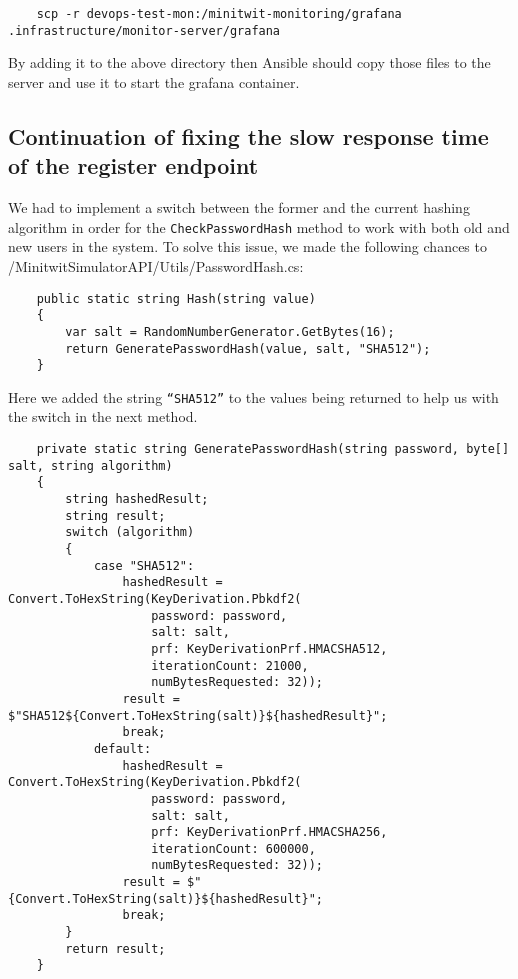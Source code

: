 \begin{verbatim}
    scp -r devops-test-mon:/minitwit-monitoring/grafana .infrastructure/monitor-server/grafana
\end{verbatim}

By adding it to the above directory then Ansible should copy those files to the server and use it to start the grafana container.

\subsection{Continuation of fixing the slow response time of the register endpoint}
\label{log:continuation-of-fixing-the-slow-response-time-of-the-register-endpoint}

We had to implement a switch between the former and the current hashing algorithm in order for the \texttt{CheckPasswordHash} method to work with both old and new users in the system. To solve this issue, we made the following chances to /MinitwitSimulatorAPI/Utils/PasswordHash.cs:

\begin{verbatim}
    public static string Hash(string value)
    {
        var salt = RandomNumberGenerator.GetBytes(16);
        return GeneratePasswordHash(value, salt, "SHA512");
    }
\end{verbatim}

Here we added the string \texttt{“SHA512”} to the values being returned to help us with the switch in the next method.

\begin{verbatim}
    private static string GeneratePasswordHash(string password, byte[] salt, string algorithm)
    {
        string hashedResult;
        string result;
        switch (algorithm)
        {
            case "SHA512":
                hashedResult = Convert.ToHexString(KeyDerivation.Pbkdf2(
                    password: password,
                    salt: salt,
                    prf: KeyDerivationPrf.HMACSHA512,
                    iterationCount: 21000,
                    numBytesRequested: 32));
                result = $"SHA512${Convert.ToHexString(salt)}${hashedResult}";
                break;
            default:
                hashedResult = Convert.ToHexString(KeyDerivation.Pbkdf2(
                    password: password,
                    salt: salt,
                    prf: KeyDerivationPrf.HMACSHA256,
                    iterationCount: 600000,
                    numBytesRequested: 32));
                result = $"{Convert.ToHexString(salt)}${hashedResult}";
                break;
        }
        return result;
    }
\end{verbatim}

